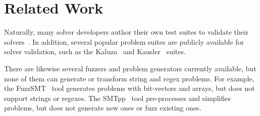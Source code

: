 \section{Related Work}

    Naturally, many solver developers author their own test suites to validate their solvers~\cite{cvc4-tests,z3str3-tests,z3str2-tests}. In addition, several popular problem suites are publicly available for solver validation, such as the Kaluza~\cite{kaluza} and Kausler~\cite{kausler} suites.

    There are likewise several fuzzers and problem generators currently available, but none of them can generate or transform string and regex problems. For example, the FuzzSMT~\cite{fuzzsmt} tool generates \smt{} problems with bit-vectors and arrays, but does not support strings or regexes. The SMTpp~\cite{smtpp} tool pre-processes and simplifies problems, but does not generate new ones or fuzz existing ones.

